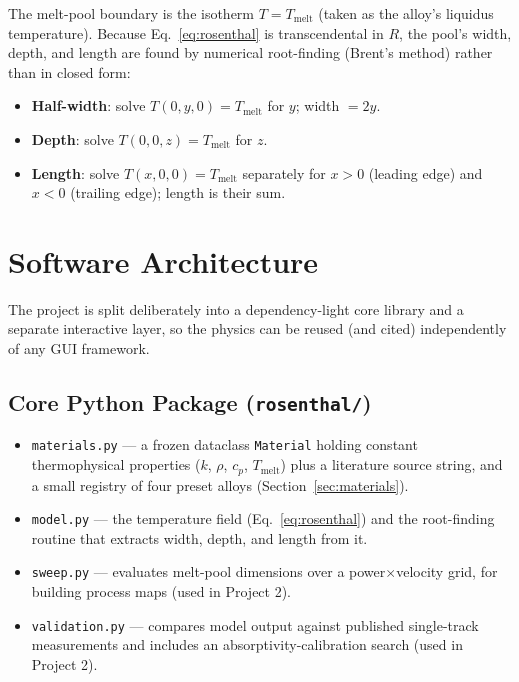 \documentclass[10pt,journal]{IEEEtran}
\begin{document}
The melt-pool boundary is the isotherm $T = T_{\text{melt}}$ (taken as the alloy's liquidus temperature). Because Eq.~\ref{eq:rosenthal} is transcendental in $R$, the pool's width, depth, and length are found by numerical root-finding (Brent's method) rather than in closed form:

\begin{itemize}
\item \textbf{Half-width}: solve $T(0, y, 0) = T_{\text{melt}}$ for $y$; width $= 2y$.
\item \textbf{Depth}: solve $T(0, 0, z) = T_{\text{melt}}$ for $z$.
\item \textbf{Length}: solve $T(x, 0, 0) = T_{\text{melt}}$ separately for $x>0$ (leading edge) and $x<0$ (trailing edge); length is their sum.
\end{itemize}

\section{Software Architecture}

The project is split deliberately into a dependency-light core library and a separate interactive layer, so the physics can be reused (and cited) independently of any GUI framework.

\subsection{Core Python Package (\texttt{rosenthal/})}

\begin{itemize}
\item \texttt{materials.py} --- a frozen dataclass \texttt{Material} holding constant thermophysical properties ($k$, $\rho$, $c_p$, $T_{\text{melt}}$) plus a literature source string, and a small registry of four preset alloys (Section~\ref{sec:materials}).
\item \texttt{model.py} --- the temperature field (Eq.~\ref{eq:rosenthal}) and the root-finding routine that extracts width, depth, and length from it.
\item \texttt{sweep.py} --- evaluates melt-pool dimensions over a power$\times$velocity grid, for building process maps (used in Project 2).
\item \texttt{validation.py} --- compares model output against published single-track measurements and includes an absorptivity-calibration search (used in Project 2).
\end{itemize}
\end{document}
